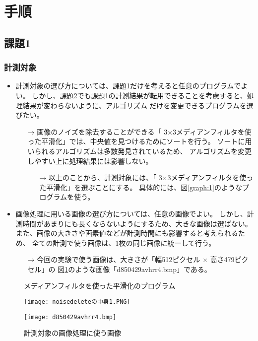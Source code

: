 \section{手順}
\subsection{課題1}
\subsubsection{計測対象}
\begin{itemize}
  \item 計測対象の選び方については、課題1だけを考えると任意のプログラムでよい。
  しかし、課題2でも課題1の計測結果が転用できることを考慮すると、処理結果が変わらないように、アルゴリズム
  だけを変更できるプログラムを選びたい。
  \begin{itemize}
    \item[→] 画像のノイズを除去することができる「
    3×3メディアンフィルタを使った平滑化」では、中央値を見つけるためにソートを行う。
    ソートに用いられるアルゴリズムは多数発見されているため、
    アルゴリズムを変更しやすい上に処理結果には影響しない。
    \begin{itemize}
      \item[→] 以上のことから、計測対象には、「
      3×3メディアンフィルタを使った平滑化」を選ぶことにする。
      具体的には、図\ref{graph:1}のようなプログラムを使う。
    \end{itemize}
  \end{itemize}
\end{itemize}
\begin{itemize}
  \item 画像処理に用いる画像の選び方については、任意の画像でよい。
  しかし、計測時間があまりにも長くならないようにするため、大きな画像は選ばない。
  また、画像の大きさや画素値などが計測時間にも影響すると考えられるため、
  全ての計測で使う画像は、1枚の同じ画像に統一して行う。
  \begin{itemize}
    \item[→] 今回の実験で使う画像は、大きさが「幅512ピクセル × 高さ479ピクセル」の
    図\ref{graph:2}のような画像「d850429avhrr4.bmp」である。
  \end{itemize}
\end{itemize}

\begin{figure}[hbtp]
  \begin{minipage}[t]{0.7\hsize}   
    \centering
    \caption{メディアンフィルタを使った平滑化のプログラム}
    \label{graph:1}
    \texttt{[image: noisedeleteの中身1.PNG]}
  \end{minipage}
  \begin{minipage}[t]{0.28\hsize}
    \centering
    \caption{計測対象の画像処理に使う画像}
    \label{graph:2}
    \texttt{[image: d850429avhrr4.bmp]}
  \end{minipage}
\end{figure}

